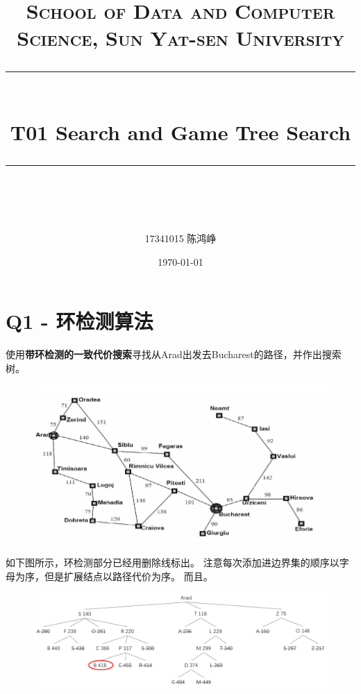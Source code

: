 \documentclass[a4paper, 11pt]{article}
\title{	
\normalfont \normalsize
\textsc{School of Data and Computer Science, Sun Yat-sen University} \\ [25pt] %
\rule{\textwidth}{0.5pt} \\[0.4cm] %
\huge  T01 Search and Game Tree Search\\ %
\rule{\textwidth}{2pt} \\[0.5cm] %
\author{17341015 陈鸿峥}
\date{\normalsize\today}
}
\begin{document}
\maketitle
\tableofcontents
\newpage

\begin{flushleft}
\end{flushleft}

\section{Q1 - 环检测算法}
\begin{question}
使用\textbf{带环检测的一致代价搜索}寻找从Arad出发去Bucharest的路径，并作出搜索树。
\begin{figure}[H]
\centering
\includegraphics[width=0.8\linewidth]{fig/map.png}
\end{figure}
\end{question}
\begin{answer}
如下图所示，环检测部分已经用删除线标出。
注意每次添加进边界集的顺序以字母为序，但是扩展结点以路径代价为序。
而且。
\begin{figure}[H]
\centering
\includegraphics[width=\linewidth]{fig/A1.png}
\end{figure}
\end{answer}
\begin{flushleft}
\end{flushleft}
\end{document}
